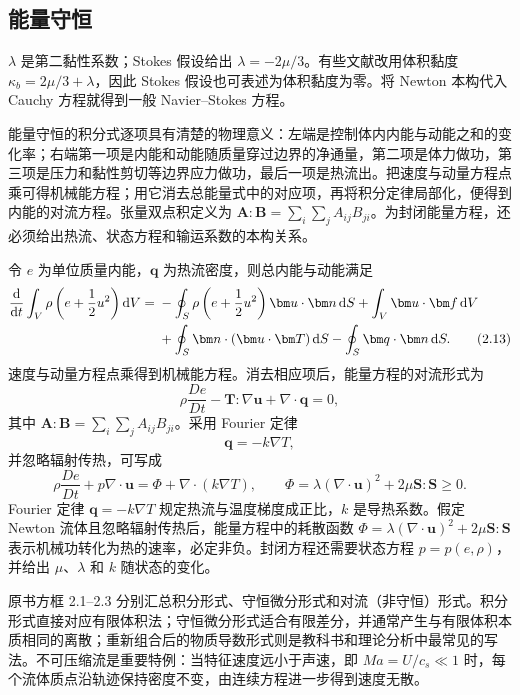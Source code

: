 \documentclass[11pt,a4paper,openany,fontset=none]{ctexbook}
\begin{document}
\subsection{能量守恒}

$\lambda$ 是第二黏性系数；Stokes 假设给出 $\lambda=-2\mu/3$。有些文献改用体积黏度 $\kappa_b=2\mu/3+\lambda$，因此 Stokes 假设也可表述为体积黏度为零。将 Newton 本构代入 Cauchy 方程就得到一般 Navier--Stokes 方程。

能量守恒的积分式逐项具有清楚的物理意义：左端是控制体内内能与动能之和的变化率；右端第一项是内能和动能随质量穿过边界的净通量，第二项是体力做功，第三项是压力和黏性剪切等边界应力做功，最后一项是热流出。把速度与动量方程点乘可得机械能方程；用它消去总能量式中的对应项，再将积分定律局部化，便得到内能的对流方程。张量双点积定义为 $\bm A:\bm B=\sum_i\sum_j A_{ij}B_{ji}$。为封闭能量方程，还必须给出热流、状态方程和输运系数的本构关系。


令 $e$ 为单位质量内能，$\bm q$ 为热流密度，则总内能与动能满足
\begin{align}
 \frac{\mathrm d}{\mathrm dt}\int_V\rho\left(e+\frac12u^2\right)\mathrm dV
 ={}&-\oint_S\rho\left(e+\frac12u^2\right)\bm u\cdot\bm n\,\mathrm dS
 +\int_V\bm u\cdot\bm f\,\mathrm dV \notag\\
 &+\oint_S\bm n\cdot(\bm u\cdot\bm T)\,\mathrm dS
 -\oint_S\bm q\cdot\bm n\,\mathrm dS . \tag{2.13}
\end{align}
速度与动量方程点乘得到机械能方程。消去相应项后，能量方程的对流形式为
\begin{equation}
 \rho\frac{De}{Dt}-\bm T:\nabla\bm u+\nabla\cdot\bm q=0, \tag{2.15}
\end{equation}
其中 $\bm A:\bm B=\sum_i\sum_j A_{ij}B_{ji}$。采用 Fourier 定律
\begin{equation}
 \bm q=-k\nabla T, \tag{2.16}
\end{equation}
并忽略辐射传热，可写成
\begin{equation}
 \rho\frac{De}{Dt}+p\nabla\cdot\bm u=\Phi+\nabla\cdot(k\nabla T),\qquad
 \Phi=\lambda(\nabla\cdot\bm u)^2+2\mu\bm S:\bm S\ge0 . \tag{2.17}
\end{equation}
Fourier 定律 $\bm q=-k\nabla T$ 规定热流与温度梯度成正比，$k$ 是导热系数。假定 Newton 流体且忽略辐射传热后，能量方程中的耗散函数 $\Phi=\lambda(\nabla\cdot\bm u)^2+2\mu\bm S:\bm S$ 表示机械功转化为热的速率，必定非负。封闭方程还需要状态方程 $p=p(e,\rho)$，并给出 $\mu$、$\lambda$ 和 $k$ 随状态的变化。

原书方框 2.1--2.3 分别汇总积分形式、守恒微分形式和对流（非守恒）形式。积分形式直接对应有限体积法；守恒微分形式适合有限差分，并通常产生与有限体积本质相同的离散；重新组合后的物质导数形式则是教科书和理论分析中最常见的写法。不可压缩流是重要特例：当特征速度远小于声速，即 $Ma=U/c_s\ll1$ 时，每个流体质点沿轨迹保持密度不变，由连续方程进一步得到速度无散。
\end{document}
